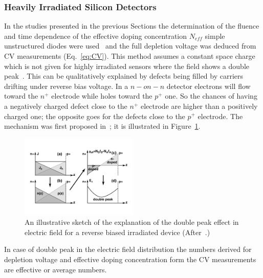\subsubsection{Heavily Irradiated Silicon Detectors}

In the studies presented in the previous Sections the determination of the fluence and time 
dependence of the effective doping concentration  $N_{eff}$
simple unstructured diodes were used~\cite{moll-thesis} 
and the full depletion voltage was deduced from CV 
measurements (Eq.~\ref{eq:CV}). This method assumes a constant space charge which is not 
given 
for highly irradiated sensors where the field shows a double peak~\cite{Li1992}. This can be 
qualitatively explained by defects being filled by carriers drifting under reverse bias voltage. 
In a $n-on-n$ detector electrons will flow toward the $n^+$ electrode while holes toward the $p^+$ one. 
So the chances of having a negatively charged defect close to the   $n^+$ electrode  are higher 
than a positively charged one; the opposite goes for the defects close to the $p^+$ electrode. 
The mechanism was first proposed in~\cite{bib:DP};
 it is illustrated in Figure~\ref{fig:Chiochia2005DP}.
\begin{figure}[htpb]
 \centering
 \includegraphics[width=0.5\textwidth]{Chiochia2005DP.pdf}
 \caption{\label{fig:Chiochia2005DP} An illustrative sketch of the explanation of the double peak effect in electric field  for a reverse biased irradiated device (After~\cite{Chiochia2005}.)}
 \end{figure}

In case of double peak in the electric field distribution the numbers derived for depletion voltage and 
effective doping concentration form the CV measurements 
are effective or average numbers.

